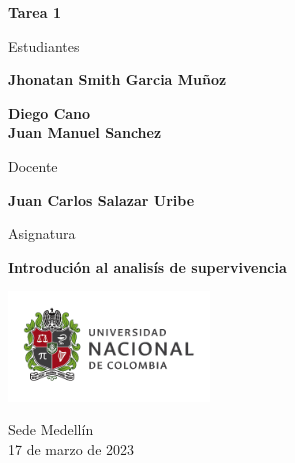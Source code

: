 \begin{titlepage}
   \Large{
   \begin{center}
       \vspace*{1cm}

       \textbf{Tarea 1}

            
       \vspace{1.1cm}
       
       Estudiantes
       
       \vspace{0.5cm}
        
	\textbf{Jhonatan Smith Garcia Muñoz}        

       \textbf{Diego Cano} \\

	\textbf{Juan Manuel Sanchez} \\

	\textbf{}

              \vspace{1cm}
       
       Docente
       
       \vspace{0.5cm}

       \textbf{Juan Carlos Salazar Uribe}
       
       \vspace{0.4cm}

       \vspace{1.4cm}
       
       Asignatura
       
       \vspace{0.5cm}

       \textbf{Introdución al analisís de supervivencia}

       \vfill

            
       \vspace{0.4cm}
     
       \includegraphics[width=0.4\textwidth]{logounal.png}
            
       Sede Medellín\\
       17 de marzo de 2023
       
   \end{center}
   }
\end{titlepage}